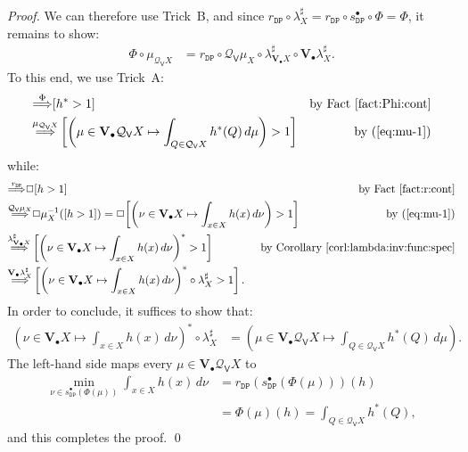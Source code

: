\documentclass[preprint,12pt]{elsarticle}
\newcommand\Demon{{\mathtt{D}}}
\newcommand\Nature{{\mathtt{P}}}
\newcommand\DN{{\Demon\Nature}}
\newcommand\invto[1]{{\buildrel {#1} \over\Longrightarrow}}
\newcommand\Smyth{{\mathcal Q}}
\newcommand\Vt{\mathsf{V}}
\newcommand\SV{\Smyth_{\Vt}}
\newcommand\Val{{\mathbf V}}
\begin{document}
\begin{proof}
  We can therefore use Trick~B, and since $r_\DN \circ {\lambda^\sharp_X} =
  r_\DN \circ s_\DN^\bullet \circ \Phi = \Phi$, it remains to show:
  \begin{align*}
    \Phi \circ \mu_{\SV X}
    & = r_\DN \circ \SV {\mu_X} \circ \lambda^\sharp_{\Val_\bullet X} \circ \Val_\bullet {\lambda^\sharp_X}.
  \end{align*}
  To this end, we use Trick~A:
  \begin{align*}
    [h > 1]
    & \invto{\Phi}
      [h^* > 1]
    & \text{by Fact~\ref{fact:Phi:cont}} \\
    & \invto{\mu_{\SV X}}
      \left[\left(\mu \in \Val_\bullet {\SV X} \mapsto \int_{Q \in \SV X} h^*
      (Q) \,d\mu\right) > 1\right]
    & \text{by (\ref{eq:mu-1})}
  \end{align*}
  while:
  \begin{align*}
    [h > 1]
    & \invto{r_\DN}
      \Box {[h > 1]}
    & \text{by Fact~\ref{fact:r:cont}} \\
    & \invto{\SV {\mu_X}}
      \Box {\mu_X^{-1} ([h > 1])}
      = \Box {\left[\left(\nu \in \Val_\bullet X \mapsto \int_{x \in X} h (x)
      \,d\nu\right) > 1\right]}
      \mskip-80mu
    & \text{by (\ref{eq:mu-1})} \\
    & \invto{\lambda^\sharp_{\Val_\bullet X}}
      \left[\left(\nu \in \Val_\bullet X \mapsto \int_{x \in X} h (x)
      \,d\nu\right)^* > 1\right]
    & \text{by Corollary~\ref{corl:lambda:inv:func:spec}} \\
    & \invto{\Val_\bullet {\lambda^\sharp_X}}
      \left[\left(\nu \in \Val_\bullet X \mapsto \int_{x \in X} h (x)
      \,d\nu\right)^* \circ {\lambda^\sharp_X} > 1\right].
  \end{align*}
  In order to conclude, it suffices to show that:
  \begin{align*}
    \left(\nu \in \Val_\bullet X \mapsto \int_{x \in X} h (x)
    \,d\nu\right)^* \circ {\lambda^\sharp_X}
    & = (\mu \in \Val_\bullet {\SV X} \mapsto \int_{Q \in \SV X} h^*
      (Q) \,d\mu).
  \end{align*}
  The left-hand side maps every $\mu \in \Val_\bullet {\SV X}$ to
  \begin{align*}
    \min_{\nu \in s_\DN^\bullet (\Phi (\mu))} \int_{x \in X} h (x)
    \,d\nu
    & = r_\DN (s_\DN^\bullet (\Phi (\mu))) (h) \\
    & = \Phi (\mu) (h) = \int_{Q \in \SV X} h^*
      (Q),
  \end{align*}
  and this completes the proof.  \qed
\end{proof}
\end{document}
